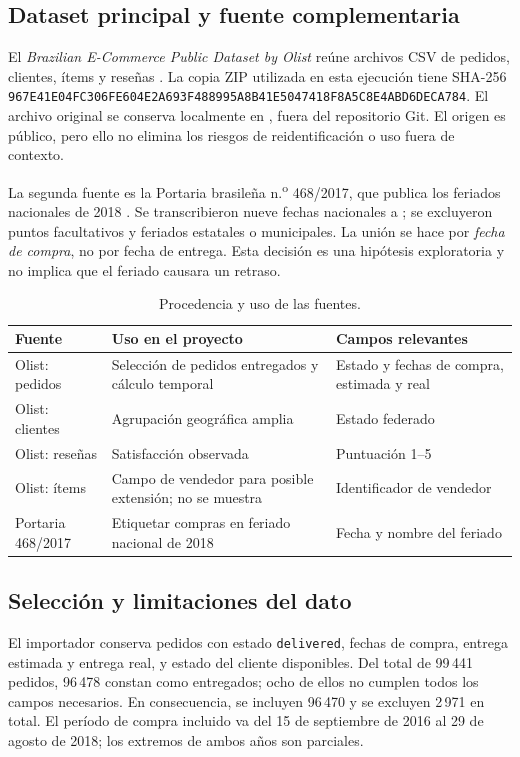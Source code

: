 \documentclass[12pt,a4paper]{article}
\begin{document}
\subsection{Dataset principal y fuente complementaria}
El \emph{Brazilian E-Commerce Public Dataset by Olist} reúne archivos CSV de pedidos, clientes, ítems y reseñas \cite{olist}. La copia ZIP utilizada en esta ejecución tiene SHA-256 \texttt{967E41E04FC306FE604E2A693F488995A8B41E5047418F8A5C8E4ABD6DECA784}. El archivo original se conserva localmente en , fuera del repositorio Git. El origen es público, pero ello no elimina los riesgos de reidentificación o uso fuera de contexto.

La segunda fuente es la Portaria brasileña n.\textsuperscript{o} 468/2017, que publica los feriados nacionales de 2018 \cite{feriados}. Se transcribieron nueve fechas nacionales a ; se excluyeron puntos facultativos y feriados estatales o municipales. La unión se hace por \emph{fecha de compra}, no por fecha de entrega. Esta decisión es una hipótesis exploratoria y no implica que el feriado causara un retraso.

\begin{table}[H]
\centering\small
\begin{tabularx}{\textwidth}{P{3.6cm}Y P{3.2cm}}
\toprule
Fuente & Uso en el proyecto & Campos relevantes\\
\midrule
Olist: pedidos & Selección de pedidos entregados y cálculo temporal & Estado y fechas de compra, estimada y real\\
Olist: clientes & Agrupación geográfica amplia & Estado federado\\
Olist: reseñas & Satisfacción observada & Puntuación 1--5\\
Olist: ítems & Campo de vendedor para posible extensión; no se muestra & Identificador de vendedor\\
Portaria 468/2017 & Etiquetar compras en feriado nacional de 2018 & Fecha y nombre del feriado\\
\bottomrule
\end{tabularx}
\caption{Procedencia y uso de las fuentes.}
\end{table}

\subsection{Selección y limitaciones del dato}
El importador conserva pedidos con estado \texttt{delivered}, fechas de compra, entrega estimada y entrega real, y estado del cliente disponibles. Del total de 99\,441 pedidos, 96\,478 constan como entregados; ocho de ellos no cumplen todos los campos necesarios. En consecuencia, se incluyen 96\,470 y se excluyen 2\,971 en total. El período de compra incluido va del 15 de septiembre de 2016 al 29 de agosto de 2018; los extremos de ambos años son parciales.
\end{document}
